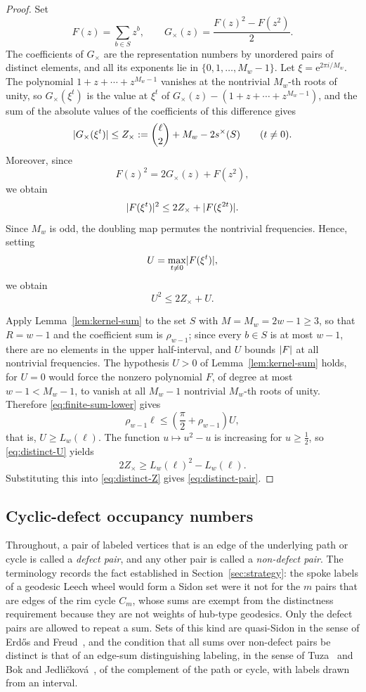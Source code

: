 \documentclass[11pt]{article}
\theoremstyle{definition}
\theoremstyle{remark}
\numberwithin{equation}{section}
\DeclarePairedDelimiter{\abs}{\lvert}{\rvert}
\newcommand{\e}{\mathrm{e}}
\begin{document}
\begin{proof}
Set
\[
  F(z)=\sum_{b\in S}z^b,
  \qquad
  G_{\times}(z)=\frac{F(z)^2-F(z^2)}2.
\]
The coefficients of $G_{\times}$ are the representation numbers by unordered pairs of distinct elements, and all its exponents lie in $\{0,1,\ldots,M_w-1\}$. Let $\xi=\e^{2\pi i/M_w}$. The polynomial $1+z+\cdots+z^{M_w-1}$ vanishes at the nontrivial $M_w$-th roots of unity, so $G_{\times}(\xi^t)$ is the value at $\xi^t$ of $G_{\times}(z)-(1+z+\cdots+z^{M_w-1})$, and the sum of the absolute values of the coefficients of this difference gives
\begin{equation}\label{eq:distinct-Z}
  \abs{G_{\times}(\xi^t)}
  \le Z_{\times}:=\binom{\ell}{2}+M_w-2s^{\times}(S)
  \qquad(t\ne0).
\end{equation}
Moreover, since
\[
  F(z)^2=2G_{\times}(z)+F(z^2),
\]
we obtain
\[
  \abs{F(\xi^t)}^2
  \le2Z_{\times}+\abs{F(\xi^{2t})}.
\]
Since $M_w$ is odd, the doubling map permutes the nontrivial frequencies. Hence, setting
\[
  U=\max_{t\ne0}\abs{F(\xi^t)},
\]
we obtain
\begin{equation}\label{eq:distinct-U}
  U^2\le2Z_{\times}+U.
\end{equation}

Apply Lemma~\ref{lem:kernel-sum} to the set $S$ with $M=M_w=2w-1\ge3$, so that $R=w-1$ and the coefficient sum is $\rho_{w-1}$; since every $b\in S$ is at most $w-1$, there are no elements in the upper half-interval, and $U$ bounds $\abs F$ at all nontrivial frequencies. The hypothesis $U>0$ of Lemma~\ref{lem:kernel-sum} holds, for $U=0$ would force the nonzero polynomial $F$, of degree at most $w-1<M_w-1$, to vanish at all $M_w-1$ nontrivial $M_w$-th roots of unity. Therefore \eqref{eq:finite-sum-lower} gives
\[
  \rho_{w-1}\ell\le\left(\frac\pi2+\rho_{w-1}\right)U,
\]
that is, $U\ge L_w(\ell)$. The function $u\mapsto u^2-u$ is increasing for $u\ge\tfrac12$, so \eqref{eq:distinct-U} yields
\[
  2Z_{\times}\ge L_w(\ell)^2-L_w(\ell).
\]
Substituting this into \eqref{eq:distinct-Z} gives \eqref{eq:distinct-pair}.
\end{proof}

\subsection{Cyclic-defect occupancy numbers}

Throughout, a pair of labeled vertices that is an edge of the underlying path or cycle is called a \emph{defect pair}, and any other pair is called a \emph{non-defect pair}. The terminology records the fact established in Section~\ref{sec:strategy}: the spoke labels of a geodesic Leech wheel would form a Sidon set were it not for the $m$ pairs that are edges of the rim cycle $C_m$, whose sums are exempt from the distinctness requirement because they are not weights of hub-type geodesics. Only the defect pairs are allowed to repeat a sum. Sets of this kind are quasi-Sidon in the sense of Erd\H os and Freud~\cite{ErdosFreud1991}, and the condition that all sums over non-defect pairs be distinct is that of an edge-sum distinguishing labeling, in the sense of Tuza~\cite{Tuza2017} and Bok and Jedli\v{c}kov\'a~\cite{BokJedlickova2021}, of the complement of the path or cycle, with labels drawn from an interval.
\end{document}
